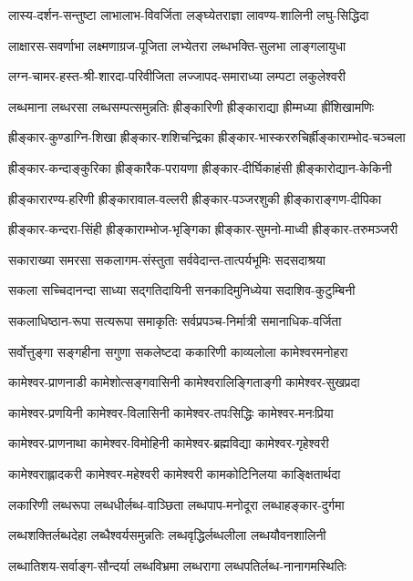 \twolineshloka
{लास्य-दर्शन-सन्तुष्टा लाभालाभ-विवर्जिता}
{लङ्घ्येतराज्ञा लावण्य-शालिनी लघु-सिद्धिदा}

\twolineshloka
{लाक्षारस-सवर्णाभा लक्ष्मणाग्रज-पूजिता}
{लभ्येतरा लब्धभक्ति-सुलभा लाङ्गलायुधा}

\twolineshloka
{लग्न-चामर-हस्त-श्री-शारदा-परिवीजिता}
{लज्जापद-समाराध्या लम्पटा लकुलेश्वरी}

\twolineshloka
{लब्धमाना लब्धरसा लब्धसम्पत्समुन्नतिः}
{ह्रीङ्कारिणी  ह्रीङ्काराद्या ह्रीम्मध्या ह्रींशिखामणिः}

\twolineshloka
{ह्रीङ्कार-कुण्डाग्नि-शिखा ह्रीङ्कार-शशिचन्द्रिका}
{ह्रीङ्कार-भास्कररुचिर्ह्रीङ्काराम्भोद-चञ्चला}

\twolineshloka
{ह्रीङ्कार-कन्दाङ्कुरिका ह्रीङ्कारैक-परायणा}
{ह्रीङ्कार-दीर्घिकाहंसी ह्रीङ्कारोद्यान-केकिनी}

\twolineshloka
{ह्रीङ्कारारण्य-हरिणी ह्रीङ्कारावाल-वल्लरी}
{ह्रीङ्कार-पञ्जरशुकी ह्रीङ्काराङ्गण-दीपिका}

\twolineshloka
{ह्रीङ्कार-कन्दरा-सिंही ह्रीङ्काराम्भोज-भृङ्गिका}
{ह्रीङ्कार-सुमनो-माध्वी ह्रीङ्कार-तरुमञ्जरी}

\twolineshloka
{सकाराख्या समरसा सकलागम-संस्तुता}
{सर्ववेदान्त-तात्पर्यभूमिः सदसदाश्रया}

\twolineshloka
{सकला सच्चिदानन्दा साध्या सद्गतिदायिनी}
{सनकादिमुनिध्येया सदाशिव-कुटुम्बिनी}

\twolineshloka
{सकलाधिष्ठान-रूपा सत्यरूपा समाकृतिः}
{सर्वप्रपञ्च-निर्मात्री समानाधिक-वर्जिता}

\twolineshloka
{सर्वोत्तुङ्गा सङ्गहीना सगुणा सकलेष्टदा}
{ककारिणी काव्यलोला कामेश्वरमनोहरा}

\twolineshloka
{कामेश्वर-प्राणनाडी कामेशोत्सङ्गवासिनी}
{कामेश्वरालिङ्गिताङ्गी कामेश्वर-सुखप्रदा}

\twolineshloka
{कामेश्वर-प्रणयिनी कामेश्वर-विलासिनी}
{कामेश्वर-तपःसिद्धिः कामेश्वर-मनःप्रिया}

\twolineshloka
{कामेश्वर-प्राणनाथा कामेश्वर-विमोहिनी}
{कामेश्वर-ब्रह्मविद्या कामेश्वर-गृहेश्वरी}

\twolineshloka
{कामेश्वराह्लादकरी कामेश्वर-महेश्वरी}
{कामेश्वरी कामकोटिनिलया काङ्क्षितार्थदा}

\twolineshloka
{लकारिणी लब्धरूपा लब्धधीर्लब्ध-वाञ्छिता}
{लब्धपाप-मनोदूरा लब्धाहङ्कार-दुर्गमा}

\twolineshloka
{लब्धशक्तिर्लब्धदेहा लब्धैश्वर्यसमुन्नतिः}
{लब्धवृद्धिर्लब्धलीला लब्धयौवनशालिनी}

\twolineshloka
{लब्धातिशय-सर्वाङ्ग-सौन्दर्या लब्धविभ्रमा}
{लब्धरागा लब्धपतिर्लब्ध-नानागमस्थितिः}

